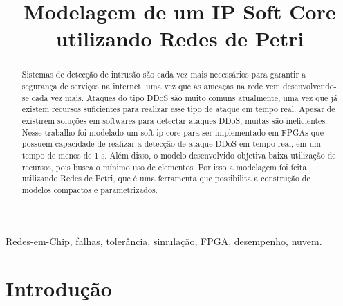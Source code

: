 \documentclass[conference]{IEEEtran}
\begin{document}
	
	\title{	Modelagem de um IP Soft Core utilizando Redes de Petri
	}
\author{
	\and
	
}
 	\maketitle
	
	\renewcommand{\abstractname}{Resumo}
	\begin{abstract}
		
		
			
	Sistemas de detecção de intrusão são cada vez mais necessários para garantir a segurança de serviços na internet, uma vez que as ameaças na rede vem desenvolvendo-se cada vez mais. Ataques do tipo DDoS são muito comuns atualmente, uma vez que já existem recursos suficientes para realizar esse tipo de ataque em tempo real. Apesar de existirem soluções em softwares para detectar ataques DDoS, muitas são ineficientes. Nesse trabalho foi modelado um soft ip core para ser implementado em  FPGAs que possuem capacidade de realizar a detecção de ataque DDoS em tempo real, em um tempo de menos de 1 \si{\micro}s. Além disso, o modelo desenvolvido objetiva baixa utilização de recursos, pois busca o mínimo uso de elementos. Por isso a modelagem foi feita utilizando Redes de Petri, que é uma ferramenta que possibilita a construção de modelos compactos e parametrizados. 
		
	\end{abstract}
	
	
	\renewcommand{\IEEEkeywordsname}{Palavras-chave}
	\begin{IEEEkeywords}
		Redes-em-Chip, falhas, tolerância, simulação, FPGA, desempenho, nuvem.
	\end{IEEEkeywords}
	
	\section{Introdução}
	
\end{document}

